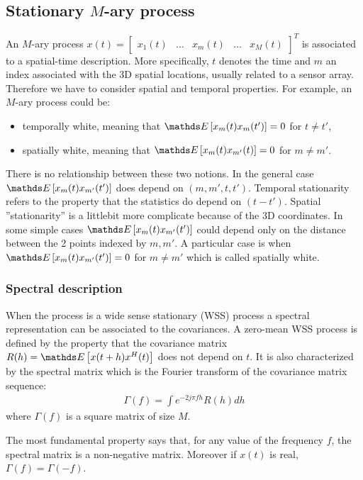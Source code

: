 \subsection{Stationary $M$-ary process}
An $M$-ary process $x(t)=\begin{bmatrix}
x_{1}(t)&\ldots&x_{m}(t)&\ldots&x_{M}(t)
\end{bmatrix}^{T}$ is associated to a spatial-time description. More specifically, $t$ denotes the time and $m$ an index associated with the 3D spatial locations, usually related to a sensor array.  Therefore we have to consider spatial and temporal properties. For example, an $M$-ary process could be:
\begin{itemize}
 \item
temporally white, meaning that $\esp{x_m(t)x_m(t')}=0$ for $t\neq t'$,
\item
spatially white, meaning that $\esp{x_m(t)x_{m'}(t)}=0$ for $m\neq m'$.
\end{itemize} 
There is no relationship between these two notions. In the general case $\esp{x_m(t)x_{m'}(t')}$ does depend on $(m,m',t,t')$. Temporal stationarity refers to the property that the statistics do depend on $(t-t')$. Spatial ''stationarity'' is a littlebit more complicate because of the 3D coordinates. In some simple cases $\esp{x_m(t)x_{m'}(t')}$ could depend only on the distance between the 2 points indexed by $m,m'$. A particular case is when $\esp{x_m(t)x_{m'}(t')}=0$ for $m\neq m'$ which is called spatially white.

\subsubsection{Spectral description}
When the process is a wide sense stationary (WSS) process  a spectral representation can be associated to the covariances. A zero-mean WSS  process is defined by the property that the covariance matrix $R(h)=\esp{x(t+h)x^{H}(t)}$ does not depend on $t$. It is also characterized by the spectral matrix which is the Fourier transform of the covariance matrix sequence:
\begin{eqnarray}
 \Gamma(f) = \int e^{-2j\pi fh}R(h)dh
\end{eqnarray}
where $\Gamma(f)$ is a square matrix of size $M$.

The most fundamental property says that, for any value of the frequency $f$, the spectral matrix is a non-negative matrix. Moreover if $x(t)$ is real, $\Gamma(f)=\Gamma(-f)$.

